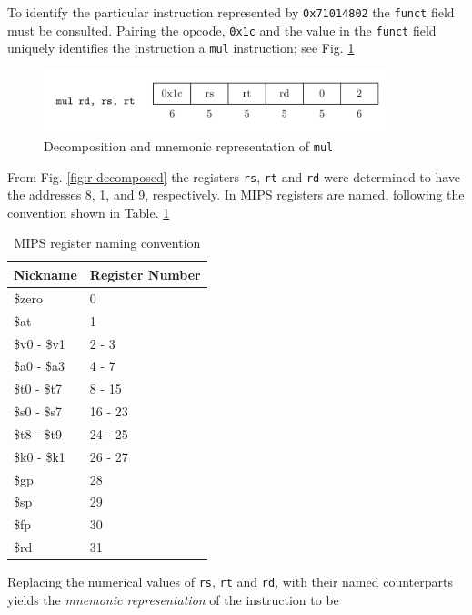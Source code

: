 \documentclass[a4paper]{article}
\begin{document}
To identify the particular instruction represented by
\texttt{0x71014802} the \texttt{funct} field must be
consulted. Pairing the opcode, \texttt{0x1c} and the value in the
\texttt{funct} field uniquely identifies the instruction a
\texttt{mul} instruction; see Fig. \ref{fig:mul-decomposed}

\begin{figure}[H]
  \centering
  \includegraphics[width=0.9\textwidth]{figures/mul-decomposed.png}
  \caption{Decomposition and mnemonic representation of \texttt{mul}}
  \label{fig:mul-decomposed}
\end{figure}

From Fig. \ref{fig:r-decomposed} the registers \texttt{rs},
\texttt{rt} and \texttt{rd} were determined to have the addresses 8,
1, and 9, respectively. In MIPS registers are named, following the
convention shown in Table. \ref{table:mips-register-naming-convention}

\begin{table}[H]
\centering
\caption{MIPS register naming convention}
\begin{tabular}{ll}
\toprule
Nickname & Register Number \\
\midrule
\$zero      & 0            \\
\$at        & 1            \\
\$v0 - \$v1 & 2 - 3        \\
\$a0 - \$a3 & 4 - 7        \\
\$t0 - \$t7 & 8 - 15       \\
\$s0 - \$s7 & 16 - 23      \\
\$t8 - \$t9 & 24 - 25      \\
\$k0 - \$k1 & 26 - 27      \\
\$gp        & 28           \\
\$sp        & 29           \\
\$fp        & 30           \\
\$rd        & 31           \\
\bottomrule
\end{tabular}
\label{table:mips-register-naming-convention}
\end{table}

Replacing the numerical values of \texttt{rs}, \texttt{rt} and
\texttt{rd}, with their named counterparts yields the \emph{mnemonic
representation} of the instruction to be
\end{document}
